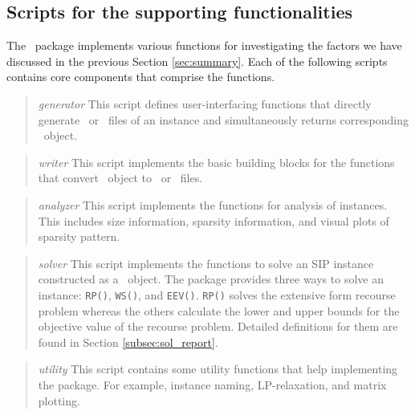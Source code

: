 \subsection{Scripts for the supporting functionalities}
The \siplibtwo\ package implements various functions for investigating the factors we have discussed in the previous Section \ref{sec:summary}. Each of the following scripts contains core components that comprise the functions.
\begin{quotation}
	\noindent\textit{generator} This script defines user-interfacing functions that directly generate \smps\ or \mps\ files of an instance and simultaneously returns corresponding \jumpmodel\ object.
\end{quotation}

\begin{quotation}
	\noindent\textit{writer} This script implements the basic building blocks for the functions that convert \jumpmodel\ object to \smps\ or \mps\ files. 
\end{quotation}

\begin{quotation}
	\noindent\textit{analyzer} This script implements the functions for analysis of instances. This includes size information, sparsity information, and visual plots of sparsity pattern.
\end{quotation}

\begin{quotation}
	\noindent\textit{solver} This script implements the functions to solve an SIP instance constructed as a \jumpmodel\ object. The package provides three ways to solve an instance: \texttt{RP()}, \texttt{WS()}, and \texttt{EEV()}. \texttt{RP()} solves the extensive form recourse problem whereas the others calculate the lower and upper bounds for the objective value of the recourse problem. Detailed definitions for them are found in Section \ref{subsec:sol_report}.
\end{quotation}

\begin{quotation}
	\noindent\textit{utility} This script contains some utility functions that help implementing the package. For example, instance naming, LP-relaxation, and matrix plotting.
\end{quotation}





